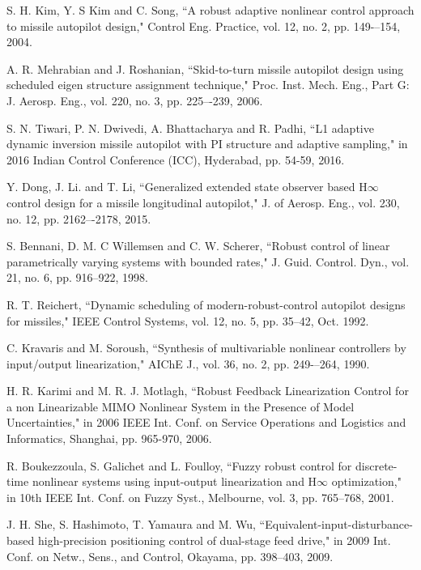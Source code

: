 \documentclass[conference]{IEEEtran}
\begin{document}
\begin{thebibliography}{00}
	
	 S. H. Kim, Y. S Kim and C. Song, ``A robust adaptive nonlinear control approach to missile autopilot design," Control Eng. Practice, vol. 12, no. 2, pp. 149-–154, 2004. \label{adaptive}
	
	 A. R. Mehrabian and J. Roshanian, ``Skid-to-turn missile autopilot design using scheduled eigen structure assignment technique," Proc. Inst. Mech. Eng., Part G: J. Aerosp. Eng., vol. 220, no. 3, pp. 225–-239, 2006. \label{eigen}
	
	 S. N. Tiwari, P. N. Dwivedi, A. Bhattacharya and R. Padhi, ``L1 adaptive dynamic inversion missile autopilot with PI structure and adaptive sampling," in 2016 Indian Control Conference (ICC), Hyderabad, pp. 54-59, 2016. \label{L1_adaptive}
	
	 Y. Dong, J. Li. and T. Li, ``Generalized extended state observer based H$\infty$ control design for a missile longitudinal autopilot," J. of Aerosp. Eng., vol. 230, no. 12, pp. 2162–-2178, 2015. \label{geso}
	
	 S. Bennani, D. M. C Willemsen and C. W. Scherer, ``Robust control of linear parametrically varying systems with bounded rates," J. Guid. Control. Dyn., vol. 21, no. 6, pp. 916--922, 1998. \label{ben}
	
	 R. T. Reichert, ``Dynamic scheduling of modern-robust-control autopilot designs for missiles," IEEE Control Systems, vol. 12, no. 5, pp. 35--42, Oct. 1992. \label{rict}
	
	 C. Kravaris and M. Soroush, ``Synthesis of multivariable nonlinear controllers by input/output linearization," AIChE J., vol. 36, no. 2, pp. 249-–264, 1990. \label{iol1}
	
	 H. R. Karimi and M. R. J. Motlagh, ``Robust Feedback Linearization Control for a non Linearizable MIMO Nonlinear System in the Presence of Model Uncertainties," in 2006 IEEE Int. Conf. on Service Operations and Logistics and Informatics, Shanghai, pp. 965-970, 2006. \label{nonlinear_mimo}
	
	 R. Boukezzoula, S. Galichet and L. Foulloy, ``Fuzzy robust control for discrete-time nonlinear systems using input-output linearization and H$\infty$ optimization," in 10th IEEE Int. Conf. on Fuzzy Syst., Melbourne, vol. 3, pp. 765--768, 2001. \label{fuzzy}
	
	 J. H. She, S. Hashimoto, T. Yamaura and M. Wu, ``Equivalent-input-disturbance-based high-precision positioning control of dual-stage feed drive," in 2009 Int. Conf. on Netw., Sens., and Control,  Okayama, pp. 398--403, 2009. \label{eid}
	

\end{thebibliography}
\end{document}

